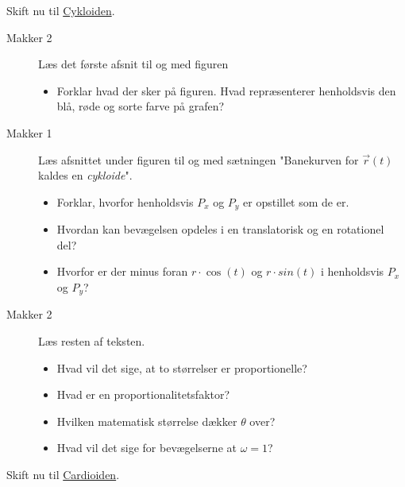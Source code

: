 \documentclass[a4paper, 12pt]{article}
\begin{document}
Skift nu til \href{https://mathtxa.systime.dk/?id=p366}{Cykloiden}.

\begin{description}
\item[{Makker 2}] Læs det første afsnit til og med figuren 
\begin{itemize}
\item Forklar hvad der sker på figuren. Hvad repræsenterer henholdsvis den blå, røde og sorte farve på grafen?
\end{itemize}

\item[{Makker 1}] Læs afsnittet under figuren til og med sætningen "Banekurven for \(\vec{r}(t)\) kaldes en \emph{cykloide}".
\begin{itemize}
\item Forklar, hvorfor henholdsvis \(P_x\) og \(P_y\) er opstillet som de er.
\item Hvordan kan bevægelsen opdeles i en translatorisk og en rotationel del?
\item Hvorfor er der minus foran \(r\cdot\cos (t)\) og \(r \cdot sin(t)\) i henholdsvis \(P_x\) og \(P_y\)?
\end{itemize}

\item[{Makker 2}] Læs resten af teksten.
\begin{itemize}
\item Hvad vil det sige, at to størrelser er proportionelle?
\item Hvad er en proportionalitetsfaktor?
\item Hvilken matematisk størrelse dækker \(\theta\) over?
\item Hvad vil det sige for bevægelserne at \(\omega = 1\)?
\end{itemize}
\end{description}

Skift nu til \href{https://mathtxa.systime.dk/?id=p367}{Cardioiden}.
\end{document}
